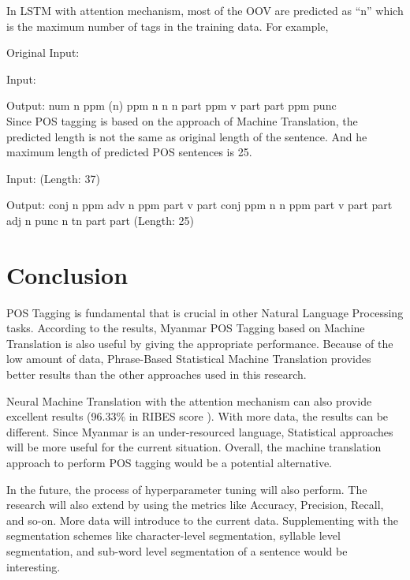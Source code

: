 \documentclass[conference]{IEEEtran}
\begin{document}
In LSTM with attention mechanism, most of the OOV are predicted as “n” which is the maximum number of tags in the training data. For example,

\noindent Original Input: 

\noindent Input: 

\noindent Output:  num n ppm (n) ppm n n n part ppm v part part ppm punc\\

Since POS tagging is based on the approach of Machine Translation, the predicted length is not the same as original length of the sentence. And he maximum length of predicted POS sentences is 25.

\noindent Input:  (Length: 37)

\noindent Output:  conj n ppm adv n ppm part v part conj ppm n n ppm part v part part adj n punc n tn part part (Length: 25)


\section{Conclusion}
\label{sec:Conclusion}
POS Tagging is fundamental that is crucial in other Natural Language Processing tasks. According to the results, Myanmar POS Tagging based on Machine Translation is also useful by giving the appropriate performance. Because of the low amount of data, Phrase-Based Statistical Machine Translation provides better results than the other approaches used in this research.

Neural Machine Translation with the attention mechanism can also provide excellent results (96.33\% in RIBES score ). With more data, the results can be different. Since Myanmar is an under-resourced language, Statistical approaches will be more useful for the current situation. Overall, the machine translation approach to perform POS tagging would be a potential alternative.

In the future, the process of hyperparameter tuning will also perform. The research will also extend by using the metrics like Accuracy, Precision, Recall, and so-on. More data will introduce to the current data. Supplementing with the segmentation schemes like character-level segmentation, syllable level segmentation, and sub-word level segmentation of a sentence would be interesting.
\end{document}
